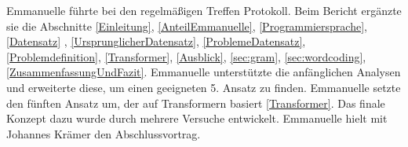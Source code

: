 \label{AnteilEmmanuelle}
Emmanuelle führte bei den regelmäßigen Treffen Protokoll.
Beim Bericht ergänzte sie die Abschnitte \ref{Einleitung}, \ref{AnteilEmmanuelle}, \ref{Programmiersprache}, \ref{Datensatz} , \ref{UrsprunglicherDatensatz}, \ref{ProblemeDatensatz}, \ref{Problemdefinition}, \ref{Transformer}, \ref{Ausblick}, \ref{sec:gram}, \ref{sec:wordcoding}, \ref{ZusammenfassungUndFazit}.
Emmanuelle unterstützte die anfänglichen Analysen und erweiterte diese, um einen geeigneten 5. Ansatz zu finden.
Emmanuelle setzte den fünften Ansatz um, der auf Transformern basiert \ref{Transformer}. Das finale Konzept dazu wurde durch mehrere Versuche entwickelt.
Emmanuelle hielt mit Johannes Krämer den Abschlussvortrag. %

